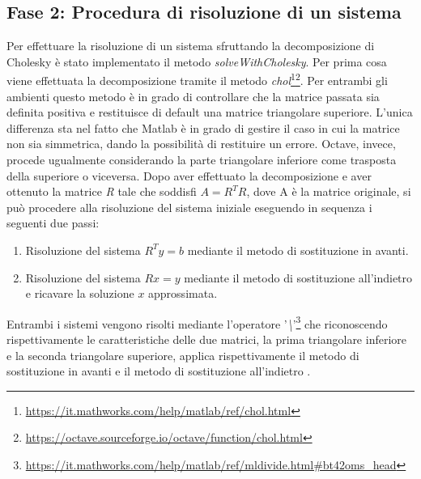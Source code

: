 \subsection{Fase 2: Procedura di risoluzione di un sistema}
Per effettuare la risoluzione di un sistema sfruttando la decomposizione di Cholesky è stato implementato il metodo \emph{solveWithCholesky}. 
Per prima cosa viene effettuata la decomposizione tramite il metodo \emph{chol}\footnote{\url{https://it.mathworks.com/help/matlab/ref/chol.html}}\footnote{\url{https://octave.sourceforge.io/octave/function/chol.html}}.
Per entrambi gli ambienti questo metodo è in grado di controllare che la matrice passata sia definita positiva e restituisce di default 
una matrice triangolare superiore. L'unica differenza sta nel fatto che Matlab è in grado di gestire il caso in cui la matrice non sia 
simmetrica, dando la possibilità di restituire un errore. Octave, invece, procede ugualmente considerando la parte triangolare inferiore come trasposta della superiore
o viceversa.
Dopo aver effettuato la decomposizione e aver ottenuto la matrice \emph{R} tale che  soddisfi $A = R^{T}R$, dove A è la matrice originale, si può procedere alla risoluzione del sistema iniziale eseguendo in sequenza i seguenti due passi:
\begin{enumerate}
    \item Risoluzione del sistema $R^{T}y = b$ mediante il metodo di sostituzione in avanti.
    \item Risoluzione del sistema $Rx = y$ mediante il metodo di sostituzione all'indietro e ricavare la soluzione $x$ approssimata.
\end{enumerate}
Entrambi i sistemi vengono risolti mediante l'operatore '\emph{\textbackslash{}}'\footnote{\url{https://it.mathworks.com/help/matlab/ref/mldivide.html\#bt42oms_head}} che riconoscendo rispettivamente le caratteristiche delle due matrici, la prima triangolare inferiore e la seconda triangolare superiore, applica rispettivamente il metodo di sostituzione in avanti e il metodo di sostituzione all'indietro \cite{quarteroni2006scientific}. \\

